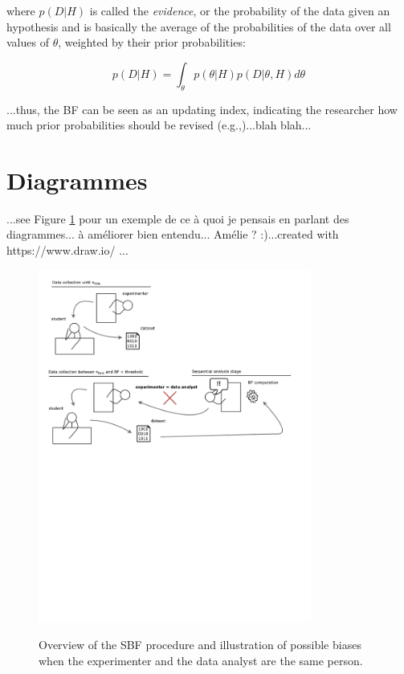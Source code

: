 \documentclass[a4paper,man,natbib,floatsintext]{apa6}
\begin{document}
where $p(D|H)$ is called the \emph{evidence}, or the probability of the data given an hypothesis and is basically the average of the probabilities of the data over all values of $\theta$, weighted by their prior probabilities:

\begin{equation}
p(D|H) = \int_{\theta} p(\theta|H) p(D|\theta,H) d\theta
\end{equation}

\vspace{5mm}

...thus, the BF can be seen as an updating index, indicating the researcher how much prior probabilities should be revised (e.g.,\cite{kruschke_bayesian_2017-1})...blah blah...

\section{Diagrammes}

...see Figure \ref{fig:diag1} pour un exemple de ce à quoi je pensais en parlant des diagrammes... à améliorer bien entendu... Amélie ? :)...created with https://www.draw.io/ ...

\begin{figure}[H]
  \caption{Overview of the SBF procedure and illustration of possible biases when the experimenter and the data analyst are the same person.}
  \centering
  \includegraphics[width=0.8\textwidth]{figures/bias_diag.pdf}
  \label{fig:diag1}
\end{figure}
\end{document}
